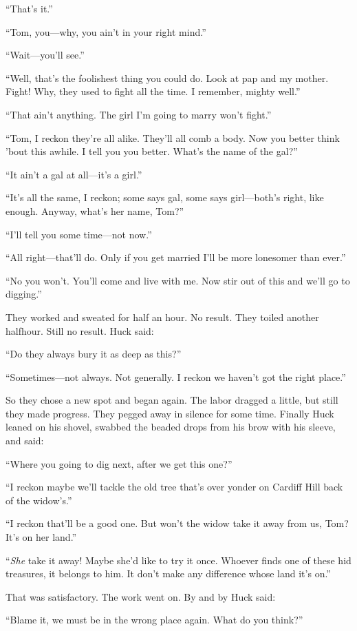 \documentclass{book}
\begin{document}
“That’s it.”

“Tom, you—why, you ain’t in your right mind.”

“Wait—you’ll see.”

“Well, that’s the foolishest thing you could do. Look at pap and my mother. Fight! Why, they used to fight all the time. I remember, mighty well.”

“That ain’t anything. The girl I’m going to marry won’t fight.”

“Tom, I reckon they’re all alike. They’ll all comb a body. Now you better think ’bout this awhile. I tell you you better. What’s the name of the gal?”

“It ain’t a gal at all—it’s a girl.”

“It’s all the same, I reckon; some says gal, some says girl—both’s right, like enough. Anyway, what’s her name, Tom?”

“I’ll tell you some time—not now.”

“All right—that’ll do. Only if you get married I’ll be more lonesomer than ever.”

“No you won’t. You’ll come and live with me. Now stir out of this and we’ll go to digging.”

They worked and sweated for half an hour. No result. They toiled another halfhour. Still no result. Huck said:

“Do they always bury it as deep as this?”

“Sometimes—not always. Not generally. I reckon we haven’t got the right place.”

So they chose a new spot and began again. The labor dragged a little, but still they made progress. They pegged away in silence for some time. Finally Huck leaned on his shovel, swabbed the beaded drops from his brow with his sleeve, and said:

“Where you going to dig next, after we get this one?”

“I reckon maybe we’ll tackle the old tree that’s over yonder on Cardiff Hill back of the widow’s.”

“I reckon that’ll be a good one. But won’t the widow take it away from us, Tom? It’s on her land.”

“\emph{She} take it away! Maybe she’d like to try it once. Whoever finds one of these hid treasures, it belongs to him. It don’t make any difference whose land it’s on.”

That was satisfactory. The work went on. By and by Huck said:

“Blame it, we must be in the wrong place again. What do you think?”
\end{document}
